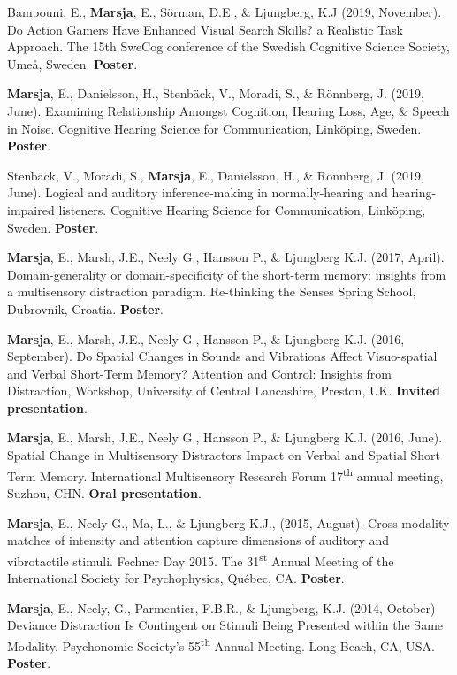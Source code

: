 \documentclass[]{article}
\begin{document}
Bampouni, E., \textbf{Marsja}, E., Sörman, D.E., \& Ljungberg, K.J
(2019, November). Do Action Gamers Have Enhanced Visual Search Skills? a
Realistic Task Approach. The 15th SweCog conference of the Swedish
Cognitive Science Society, Umeå, Sweden. \textbf{Poster}.

\textbf{Marsja}, E., Danielsson, H., Stenbäck, V., Moradi, S., \&
Rönnberg, J. (2019, June). Examining Relationship Amongst Cognition,
Hearing Loss, Age, \& Speech in Noise. Cognitive Hearing Science for
Communication, Linköping, Sweden. \textbf{Poster}.

Stenbäck, V., Moradi, S., \textbf{Marsja}, E., Danielsson, H., \&
Rönnberg, J. (2019, June). Logical and auditory inference-making in
normally-hearing and hearing-impaired listeners. Cognitive Hearing
Science for Communication, Linköping, Sweden. \textbf{Poster}.

\textbf{Marsja}, E., Marsh, J.E., Neely G., Hansson P., \& Ljungberg
K.J. (2017, April). Domain-generality or domain-specificity of the
short-term memory: insights from a multisensory distraction paradigm.
Re-thinking the Senses Spring School, Dubrovnik, Croatia.
\textbf{Poster}.

\textbf{Marsja}, E., Marsh, J.E., Neely G., Hansson P., \& Ljungberg
K.J. (2016, September). Do Spatial Changes in Sounds and Vibrations
Affect Visuo-spatial and Verbal Short-Term Memory? Attention and
Control: Insights from Distraction, Workshop, University of Central
Lancashire, Preston, UK. \textbf{Invited presentation}.

\textbf{Marsja}, E., Marsh, J.E., Neely G., Hansson P., \& Ljungberg
K.J. (2016, June). Spatial Change in Multisensory Distractors Impact on
Verbal and Spatial Short Term Memory. International Multisensory
Research Forum 17\textsuperscript{th} annual meeting, Suzhou, CHN.
\textbf{Oral presentation}.

\textbf{Marsja}, E., Neely G., Ma, L., \& Ljungberg K.J., (2015,
August). Cross-modality matches of intensity and attention capture
dimensions of auditory and vibrotactile stimuli. Fechner Day 2015. The
31\textsuperscript{st} Annual Meeting of the International Society for
Psychophysics, Québec, CA. \textbf{Poster}.

\textbf{Marsja}, E., Neely, G., Parmentier, F.B.R., \& Ljungberg, K.J.
(2014, October) Deviance Distraction Is Contingent on Stimuli Being
Presented within the Same Modality. Psychonomic Society's
55\textsuperscript{th} Annual Meeting. Long Beach, CA, USA.
\textbf{Poster}.
\end{document}
